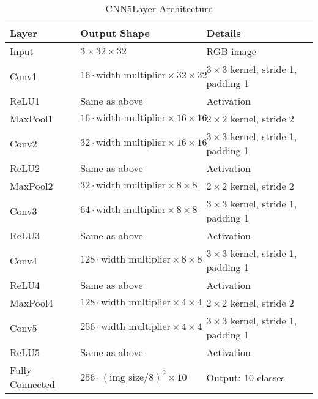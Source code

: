 \begin{table}[h]
    \centering
    \caption{CNN5Layer Architecture}
    \label{tab:cnn5layer}
    \begin{tabular}{lll}
    \toprule
    \textbf{Layer} & \textbf{Output Shape} & \textbf{Details} \\
    \midrule
    Input & $3 \times 32 \times 32$ & RGB image \\
    Conv1 & $16 \cdot \text{width multiplier} \times 32 \times 32$ & $3 \times 3$ kernel, stride 1, padding 1 \\
    ReLU1 & Same as above & Activation \\
    MaxPool1 & $16 \cdot \text{width multiplier} \times 16 \times 16$ & $2 \times 2$ kernel, stride 2 \\
    Conv2 & $32 \cdot \text{width multiplier} \times 16 \times 16$ & $3 \times 3$ kernel, stride 1, padding 1 \\
    ReLU2 & Same as above & Activation \\
    MaxPool2 & $32 \cdot \text{width multiplier} \times 8 \times 8$ & $2 \times 2$ kernel, stride 2 \\
    Conv3 & $64 \cdot \text{width multiplier} \times 8 \times 8$ & $3 \times 3$ kernel, stride 1, padding 1 \\
    ReLU3 & Same as above & Activation \\
    Conv4 & $128 \cdot \text{width multiplier} \times 8 \times 8$ & $3 \times 3$ kernel, stride 1, padding 1 \\
    ReLU4 & Same as above & Activation \\
    MaxPool4 & $128 \cdot \text{width multiplier} \times 4 \times 4$ & $2 \times 2$ kernel, stride 2 \\
    Conv5 & $256 \cdot \text{width multiplier} \times 4 \times 4$ & $3 \times 3$ kernel, stride 1, padding 1 \\
    ReLU5 & Same as above & Activation \\
    Fully Connected & $256 \cdot (\text{img size}/8)^2 \times 10$ & Output: 10 classes \\
    \bottomrule
    \end{tabular}
\end{table}

